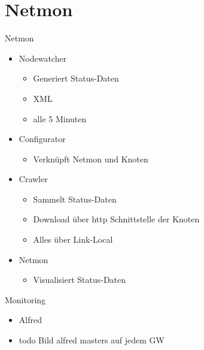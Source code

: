 \section{Netmon}


\begin{frame}{Netmon}
    \begin{itemize}
        \item Nodewatcher
        \begin{itemize}
            \item Generiert Status-Daten
            \item XML
            \item alle 5 Minuten
        \end{itemize}
        \item Configurator
        \begin{itemize}
            \item Verknüpft Netmon und Knoten
        \end{itemize}
        \item Crawler
        \begin{itemize}
            \item Sammelt Status-Daten
            \item Download über http Schnittstelle der Knoten
            \item Alles über Link-Local
        \end{itemize}
        \item Netmon
        \begin{itemize}
            \item Visualisiert Status-Daten
        \end{itemize}
    \end{itemize}
\end{frame}

\begin{frame}{Monitoring}
    \begin{itemize}
        \item Alfred
        \item todo Bild alfred masters auf jedem GW
    \end{itemize}
\end{frame}
